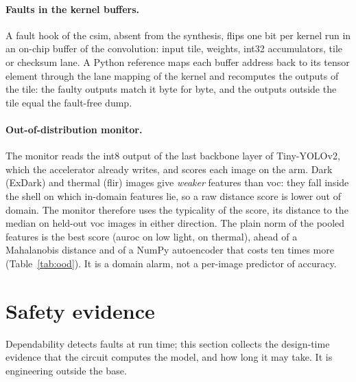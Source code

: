 \documentclass[11pt,a4paper]{article}
\begin{document}
\paragraph{Faults in the kernel buffers.} A fault hook of the \gls{csim}, absent from the
synthesis, flips one bit per kernel run in an on-chip buffer of the convolution: input \gls{tile},
weights, int32 accumulators,  \gls{tile} or checksum lane. A Python reference maps each
buffer address back to its tensor element through the lane mapping of the kernel and
recomputes the outputs of the \gls{tile}: the faulty outputs match it byte for byte, and the
outputs outside the \gls{tile} equal the fault-free \gls{dump}.

\paragraph{Out-of-distribution monitor.} The monitor reads the \gls{int8} output of the last backbone
layer of Tiny-YOLOv2, which the accelerator already writes, and scores each image on the \gls{arm}.
Dark (ExDark) and thermal (\gls{flir}) images give \emph{weaker} features than \gls{voc}: they fall inside
the shell on which in-domain features lie, so a raw distance score is lower out of domain. The
monitor therefore uses the \gls{typicality} of the score, its distance to the median on held-out
\gls{voc} images in either direction. The plain norm of the pooled features is the best score
(\gls{auroc}  on low light,  on thermal),
ahead of a Mahalanobis distance and of a NumPy autoencoder that costs ten times more
(Table~\ref{tab:ood}). It is a domain alarm, not a per-image predictor of accuracy.

\begin{table}[htbp]
\caption{\gls{ood} monitor on the features of the integer Tiny-YOLOv2, \gls{typicality} scores, \gls{voc} test
against ExDark and \gls{flir} ().}
\label{tab:ood}
\small{}
\end{table}

\section{Safety evidence}\label{sec:safety}

Dependability detects faults at run time; this section collects the design-time evidence that
the circuit computes the model, and how long it may take. It is engineering outside the \gls{base}.
\end{document}
